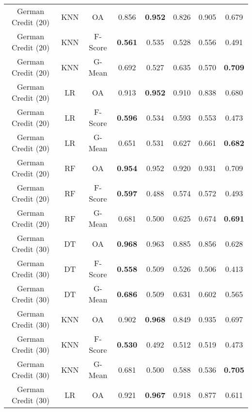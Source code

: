 \begin{longtable}{cccccccc}
German Credit (20) &        KNN &      OA &          0.856 & \textbf{0.952} &          0.826 &          0.905 &          0.679 \\
German Credit (20) &        KNN & F-Score & \textbf{0.561} &          0.535 &          0.528 &          0.556 &          0.491 \\
German Credit (20) &        KNN &  G-Mean &          0.692 &          0.527 &          0.635 &          0.570 & \textbf{0.709} \\
German Credit (20) &         LR &      OA &          0.913 & \textbf{0.952} &          0.910 &          0.838 &          0.680 \\
German Credit (20) &         LR & F-Score & \textbf{0.596} &          0.534 &          0.593 &          0.553 &          0.473 \\
German Credit (20) &         LR &  G-Mean &          0.651 &          0.531 &          0.627 &          0.661 & \textbf{0.682} \\
German Credit (20) &         RF &      OA & \textbf{0.954} &          0.952 &          0.920 &          0.931 &          0.709 \\
German Credit (20) &         RF & F-Score & \textbf{0.597} &          0.488 &          0.574 &          0.572 &          0.493 \\
German Credit (20) &         RF &  G-Mean &          0.681 &          0.500 &          0.625 &          0.674 & \textbf{0.691} \\
German Credit (30) &         DT &      OA & \textbf{0.968} &          0.963 &          0.885 &          0.856 &          0.628 \\
German Credit (30) &         DT & F-Score & \textbf{0.558} &          0.509 &          0.526 &          0.506 &          0.413 \\
German Credit (30) &         DT &  G-Mean & \textbf{0.686} &          0.509 &          0.631 &          0.602 &          0.565 \\
German Credit (30) &        KNN &      OA &          0.902 & \textbf{0.968} &          0.849 &          0.935 &          0.697 \\
German Credit (30) &        KNN & F-Score & \textbf{0.530} &          0.492 &          0.512 &          0.519 &          0.473 \\
German Credit (30) &        KNN &  G-Mean &          0.681 &          0.500 &          0.588 &          0.536 & \textbf{0.705} \\
German Credit (30) &         LR &      OA &          0.921 & \textbf{0.967} &          0.918 &          0.877 &          0.611 \\

\end{longtable}
